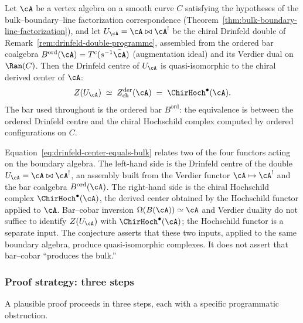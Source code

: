 \begin{conjecture}
\label{conj:drinfeld-center-equals-bulk}
Let $\cA$ be a vertex algebra on a smooth curve $C$ satisfying the
hypotheses of the bulk--boundary--line factorization correspondence
\textup{(}Theorem~\textup{\ref{thm:bulk-boundary-line-factorization}}\textup{)},
and let $U_\cA = \cA \bowtie \cA^!$ be the chiral Drinfeld double of
Remark~\textup{\ref{rem:drinfeld-double-programme}}, assembled from the
ordered bar coalgebra $B^{\mathrm{ord}}(\cA) = T^c(s^{-1}\bar\cA)$
\textup{(}augmentation ideal\textup{)} and its Verdier
dual on $\Ran(C)$. Then the Drinfeld centre of $U_\cA$ is
quasi-isomorphic to the chiral derived center of $\cA$:
\begin{equation}
\label{eq:drinfeld-center-equals-bulk}
Z(U_\cA) \;\simeq\; Z^{\mathrm{der}}_{\mathrm{ch}}(\cA)
\;=\; \ChirHoch^\bullet(\cA).
\end{equation}
The bar used throughout is the ordered bar $B^{\mathrm{ord}}$: the equivalence is between the
ordered Drinfeld centre and the chiral Hochschild complex computed by
ordered configurations on $C$.
\end{conjecture}

\begin{remark}
\label{rem:drinfeld-center-four-functors}
Equation~\eqref{eq:drinfeld-center-equals-bulk} relates two of the four
functors acting on the boundary algebra. The left-hand side is the
Drinfeld centre of the double $U_\cA = \cA \bowtie \cA^!$, an assembly
built from the Verdier functor $\cA \mapsto \cA^!$ and the bar coalgebra
$B^{\mathrm{ord}}(\cA)$. The right-hand side is the chiral Hochschild
complex $\ChirHoch^\bullet(\cA)$, the derived center obtained by the
Hochschild functor applied to $\cA$. Bar--cobar inversion
$\Omega(B(\cA)) \simeq \cA$ and Verdier duality do not suffice to identify
$Z(U_\cA)$ with $\ChirHoch^\bullet(\cA)$; the Hochschild functor is a
separate input. The conjecture asserts that these two inputs, applied
to the same boundary algebra, produce quasi-isomorphic complexes. It
does not assert that bar--cobar ``produces the bulk.''
\end{remark}

\subsubsection{Proof strategy: three steps}

A plausible proof proceeds in three steps, each with a specific
programmatic obstruction.


